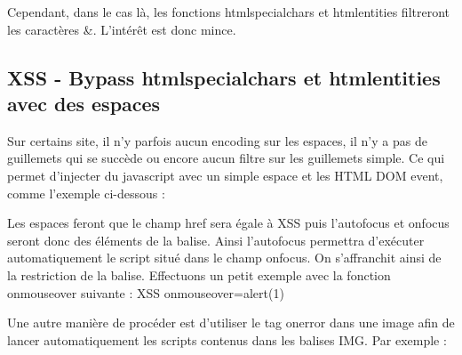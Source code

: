 \documentclass{article}
\begin{document}
Cependant, dans le cas là, les fonctions htmlspecialchars et htmlentities filtreront les caractères \&. L'intérêt est donc mince. 

\subsection{XSS - Bypass htmlspecialchars et htmlentities avec des espaces}

Sur certains site, il n'y parfois aucun encoding sur les espaces, il n'y a pas de guillemets qui se succède ou encore aucun filtre sur les guillemets simple. Ce qui permet d'injecter du javascript avec un simple espace et les HTML DOM event, comme l'exemple ci-dessous :
\vspace{0.2cm}\\
\vspace{0.2cm}

Les espaces feront que le champ href sera égale à XSS puis l'autofocus et onfocus seront donc des éléments de la balise. Ainsi l'autofocus permettra d'exécuter automatiquement le script situé dans le champ onfocus. On s'affranchit ainsi de la restriction de la balise. Effectuons un petit exemple avec la fonction onmouseover suivante : XSS onmouseover=alert(1)
\vspace{0.2cm}\\
\vspace{0.2cm}

Une autre manière de procéder est d'utiliser le tag onerror dans une image afin de lancer automatiquement les scripts contenus dans les balises IMG. Par exemple :
\vspace{0.2cm}\\
\vspace{0.2cm}
\end{document}

